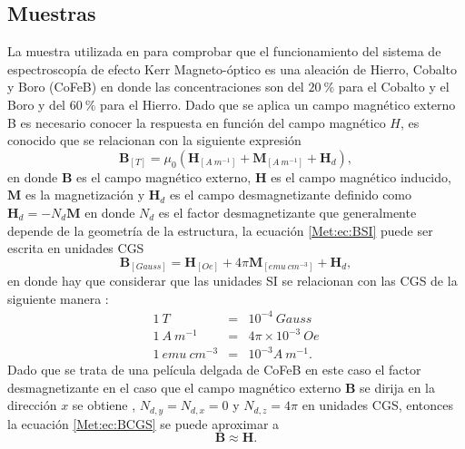 \subsection{Muestras}\label{Met:subsec:Muest}
La muestra utilizada en para comprobar que el funcionamiento del sistema de espectroscop\'ia de efecto Kerr Magneto-\'optico es una aleaci\'on de Hierro, Cobalto y Boro (CoFeB)	en donde las concentraciones son del $20~\%$ para el Cobalto y el Boro y del $60~\%$ para el Hierro. Dado que se aplica un campo magn\'etico externo B es necesario conocer la respuesta en funci\'on del campo magn\'etico $H$, es conocido que se relacionan con la siguiente expresi\'on \cite{magMan_1}
\begin{equation}
	\pmb{B}_{[T]}=\mu_0 (\pmb{H}_{[A ~m^{-1}]}+\pmb{M}_{[A ~m^{-1}]} + \pmb{H}_d ),
	\label{Met:ec:BSI}
\end{equation}  
	en donde $\pmb{B}$ es el campo magn\'etico externo, $\pmb{H}$ es el campo  magn\'etico inducido, $\pmb{M}$ es la magnetizaci\'on y $\pmb{H}_d$ es el campo desmagnetizante definido como $\pmb{H}_d = -N_d \pmb{M}$ en donde   $N_d$ es el factor desmagnetizante que generalmente depende de la geometr\'ia de la estructura, la ecuaci\'on \ref{Met:ec:BSI} puede ser escrita en unidades CGS \cite{magMan_1}
    \begin{equation}
    	\pmb{B}_{[Gauss]}= \pmb{H}_{[Oe]}+4 \pi \pmb{M}_{[emu ~cm^{-3}]} +\pmb{H}_d ,
    	\label{Met:ec:BCGS}
    \end{equation}	
en donde hay que considerar que las unidades SI se relacionan con las CGS de la siguiente manera \cite{magMan_2}:
\begin{eqnarray}
	1~T&=& 10^{-4}~ Gauss \nonumber \\
	1~ A~m^{-1} &=& 4 \pi \times 10^{-3}~ Oe \nonumber \\
	1~emu~cm^{-3} &=& 10^{-3} A~ m^{-1}. \nonumber
\end{eqnarray}
Dado que se trata de una pel\'icula delgada de CoFeB en este caso el factor desmagnetizante en el caso que el campo  magnético  externo $\pmb{B}$ se dirija en la direcci\'on $x$ se obtiene \cite{magMan_1}, $N_{d,y}=N_{d,x}=0$ y $N_{d,z}=4\pi$ en unidades CGS, entonces la ecuaci\'on \ref{Met:ec:BCGS} se puede aproximar a
\begin{equation*}
	\pmb{B} \approx \pmb{H}.
\end{equation*} 
  \endinput
